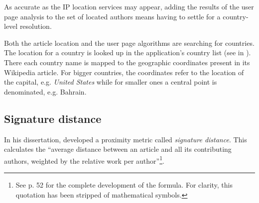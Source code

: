 As accurate as the \ac{IP} location services may appear, adding the results of the user page analysis to the set of located authors means having to settle for a country-level resolution.

Both the article location and the user page algorithms are searching for countries.
The location for a country is looked up in the application's country list (see  in ).
There each country name is mapped to the geographic coordinates present in its Wikipedia article.
For bigger countries, the coordinates refer to the location of the capital, e.g. \emph{United States} while for smaller ones a central point is denominated, e.g. Bahrain.



\subsection{Signature distance}

In his dissertation, \textcite{hardy2011volunteered} developed a proximity metric called \emph{signature distance}.
This calculates the ``average distance between an article and all its contributing authors, weighted by the relative work
per author''\footnote{See p. 52 for the complete development of the formula. For clarity, this quotation has been stripped of mathematical symbols.}.

